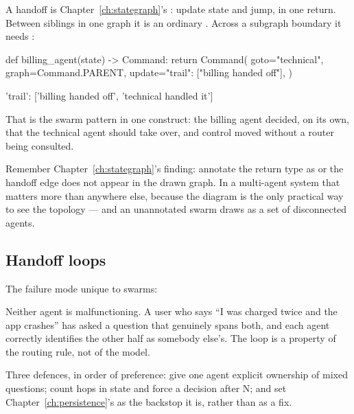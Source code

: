 A handoff is Chapter~\ref{ch:stategraph}'s : update state and jump,
in one return. Between siblings in one graph it is an ordinary .
Across a subgraph boundary it needs :

\begin{python}[caption={An agent inside a subgraph handing control to a sibling of its parent}, label={lst:handoff}]
def billing_agent(state) -> Command:
    return Command(
        goto="technical",
        graph=Command.PARENT,
        update={"trail": ["billing handed off"]},
    )
\end{python}

\begin{console}
{'trail': ['billing handed off', 'technical handled it']}
\end{console}

That is the swarm pattern in one construct: the billing agent decided, on its
own, that the technical agent should take over, and control moved without a
router being consulted.

\begin{warning}
Remember Chapter~\ref{ch:stategraph}'s finding: annotate the return type as
 or the handoff edge does not appear in
the drawn graph. In a multi-agent system that matters more than anywhere else,
because the diagram is the only practical way to see the topology --- and an
unannotated swarm draws as a set of disconnected agents.
\end{warning}

\subsection{Handoff loops}
\label{sec:handoff-loops}

The failure mode unique to swarms:


Neither agent is malfunctioning. A user who says ``I was charged twice and the
app crashes'' has asked a question that genuinely spans both, and each agent
correctly identifies the other half as somebody else's. The loop is a property of
the routing rule, not of the model.

Three defences, in order of preference: give one agent explicit ownership of
mixed questions; count hops in state and force a decision after N; and set
Chapter~\ref{ch:persistence}'s  as the backstop it is,
rather than as a fix.

